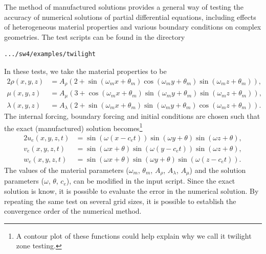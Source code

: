 \documentclass[11pt]{report}
\begin{document}
The method of manufactured solutions provides a general way of testing the accuracy of numerical
solutions of partial differential equations, including effects of heterogeneous material properties
and various boundary conditions on complex geometries. The test scripts can be found in the
directory
\begin{verbatim}
.../sw4/examples/twilight
\end{verbatim}
In these tests, we take the material properties to be
\begin{alignat*}{2}
\rho(x,y,z) &= A_\rho \left( 2 + \sin(\omega_m x + \theta_m) \cos(\omega_m y + \theta_m)
\sin(\omega_m z + \theta_m) \right),\\ 
\mu(x,y,z) &=  A_\mu \left( 3 + \cos(\omega_m x + \theta_m) \sin(\omega_m y + \theta_m)
\sin(\omega_m z + \theta_m) \right),\\ 
\lambda(x,y,z) &=  A_\lambda \left( 2 + \sin(\omega_m x + \theta_m) \sin(\omega_m y + \theta_m)
\cos(\omega_m z + \theta_m) \right).
\end{alignat*}
The internal forcing, boundary forcing and initial conditions are chosen such that the exact
(manufactured) solution becomes\footnote{A contour plot of these functions could help explain why we
  call it twilight zone testing.}
\begin{alignat*}{2}
u_e(x,y,z,t) &= \sin(\omega(x-c_e t)) \sin(\omega y + \theta) \sin(\omega z + \theta), \\
v_e(x,y,z,t) &= \sin(\omega x + \theta) \sin(\omega( y - c_e t)) \sin(\omega z + \theta), \\
w_e(x,y,z,t) &= \sin(\omega x + \theta) \sin(\omega y + \theta) \sin(\omega( z - c_e t)). 
\end{alignat*}
The values of the material parameters ($\omega_m$, $\theta_m$, $A_\rho$, $A_\lambda$, $A_\mu$) and
the solution parameters ($\omega$, $\theta$, $c_e$), can be modified in the input script. Since the
exact solution is know, it is possible to evaluate the error in the numerical solution. By repeating
the same test on several grid sizes, it is possible to establish the convergence order of the
numerical method.
\end{document}
